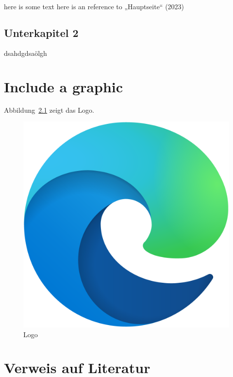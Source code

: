 \documentclass[
  11pt,
]{scrbook}
\begin{document}
here is some text here is an reference to {„Hauptseite``} (2023)

\newpage{}

\hypertarget{unterkapitel-2}{%
\section{Unterkapitel 2}\label{unterkapitel-2}}

dsahdgdsaölgh

\hypertarget{include-a-graphic}{%
\chapter{Include a graphic}\label{include-a-graphic}}

Abbildung~\ref{fig-LOGO} zeigt das Logo.

\begin{figure}

{\centering \includegraphics{logo.png}

}

\caption{\label{fig-LOGO}Logo}

\end{figure}

\hypertarget{verweis-auf-literatur}{%
\chapter{Verweis auf Literatur}\label{verweis-auf-literatur}}
\end{document}

